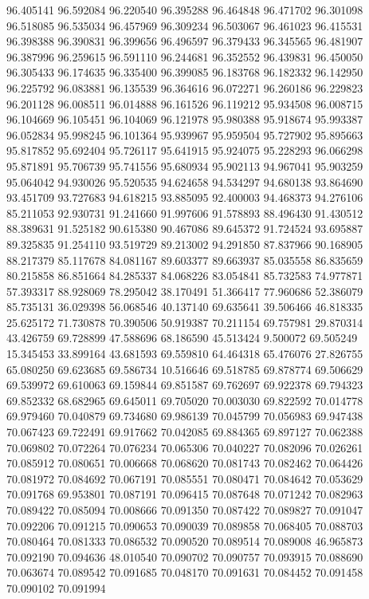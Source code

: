 96.405141
96.592084
96.220540
96.395288
96.464848
96.471702
96.301098
96.518085
96.535034
96.457969
96.309234
96.503067
96.461023
96.415531
96.398388
96.390831
96.399656
96.496597
96.379433
96.345565
96.481907
96.387996
96.259615
96.591110
96.244681
96.352552
96.439831
96.450050
96.305433
96.174635
96.335400
96.399085
96.183768
96.182332
96.142950
96.225792
96.083881
96.135539
96.364616
96.072271
96.260186
96.229823
96.201128
96.008511
96.014888
96.161526
96.119212
95.934508
96.008715
96.104669
96.105451
96.104069
96.121978
95.980388
95.918674
95.993387
96.052834
95.998245
96.101364
95.939967
95.959504
95.727902
95.895663
95.817852
95.692404
95.726117
95.641915
95.924075
95.228293
96.066298
95.871891
95.706739
95.741556
95.680934
95.902113
94.967041
95.903259
95.064042
94.930026
95.520535
94.624658
94.534297
94.680138
93.864690
93.451709
93.727683
94.618215
93.885095
92.400003
94.468373
94.276106
85.211053
92.930731
91.241660
91.997606
91.578893
88.496430
91.430512
88.389631
91.525182
90.615380
90.467086
89.645372
91.724524
93.695887
89.325835
91.254110
93.519729
89.213002
94.291850
87.837966
90.168905
88.217379
85.117678
84.081167
89.603377
89.663937
85.035558
86.835659
80.215858
86.851664
84.285337
84.068226
83.054841
85.732583
74.977871
57.393317
88.928069
78.295042
38.170491
51.366417
77.960686
52.386079
85.735131
36.029398
56.068546
40.137140
69.635641
39.506466
46.818335
25.625172
71.730878
70.390506
50.919387
70.211154
69.757981
29.870314
43.426759
69.728899
47.588696
68.186590
45.513424
9.500072
69.505249
15.345453
33.899164
43.681593
69.559810
64.464318
65.476076
27.826755
65.080250
69.623685
69.586734
10.516646
69.518785
69.878774
69.506629
69.539972
69.610063
69.159844
69.851587
69.762697
69.922378
69.794323
69.852332
68.682965
69.645011
69.705020
70.003030
69.822592
70.014778
69.979460
70.040879
69.734680
69.986139
70.045799
70.056983
69.947438
70.067423
69.722491
69.917662
70.042085
69.884365
69.897127
70.062388
70.069802
70.072264
70.076234
70.065306
70.040227
70.082096
70.026261
70.085912
70.080651
70.006668
70.068620
70.081743
70.082462
70.064426
70.081972
70.084692
70.067191
70.085551
70.080471
70.084642
70.053629
70.091768
69.953801
70.087191
70.096415
70.087648
70.071242
70.082963
70.089422
70.085094
70.008666
70.091350
70.087422
70.089827
70.091047
70.092206
70.091215
70.090653
70.090039
70.089858
70.068405
70.088703
70.080464
70.081333
70.086532
70.090520
70.089514
70.089008
46.965873
70.092190
70.094636
48.010540
70.090702
70.090757
70.093915
70.088690
70.063674
70.089542
70.091685
70.048170
70.091631
70.084452
70.091458
70.090102
70.091994
